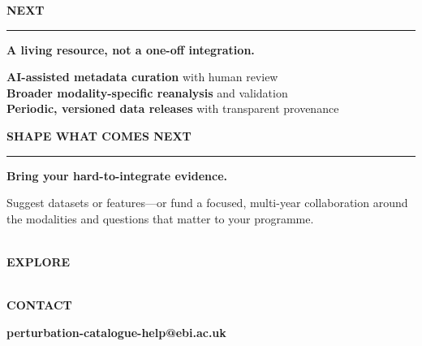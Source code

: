 \documentclass[20pt]{extarticle}
\newcommand{\sectionhead}[2]{%
  {\fontsize{17}{18}\selectfont\bfseries\color{#1}\MakeUppercase{#2}}\\[-1mm]
  {\color{#1}\rule{38mm}{2.3mm}}\par\vspace{4mm}}
\newcommand{\bighead}[1]{%
  {\fontsize{37}{40}\selectfont\bfseries\color{Navy}#1\par}}
\begin{document}
\begin{minipage}{\textwidth}
\vspace{6mm}
\begin{minipage}[t]{0.56\linewidth}
  \sectionhead{Emerald}{Next}
  \bighead{A living resource, not a one-off integration.}
  \vspace{3mm}
  \begin{tcolorbox}[enhanced,boxrule=0pt,arc=7mm,colback=Mint,
    left=9mm,right=9mm,top=7mm,bottom=7mm]
    {\fontsize{20}{25}\selectfont
      \textbf{AI-assisted metadata curation} with human review\\[3mm]
      \textbf{Broader modality-specific reanalysis} and validation\\[3mm]
      \textbf{Periodic, versioned data releases} with transparent provenance}
  \end{tcolorbox}
\end{minipage}\hfill
\begin{minipage}[t]{0.405\linewidth}
  \sectionhead{Coral}{Shape what comes next}
  \begin{tcolorbox}[enhanced,boxrule=0pt,arc=7mm,colback=Navy,
    left=9mm,right=9mm,top=8mm,bottom=8mm]
    {\fontsize{27}{30}\selectfont\bfseries\color{White}Bring your hard-to-integrate evidence.}\par
    \vspace{3mm}
    {\fontsize{17}{22}\selectfont\color{White}
      Suggest datasets or features---or fund a focused, multi-year collaboration around the modalities and questions that matter to your programme.}
    \vspace{6mm}

    \begin{minipage}[c]{0.46\linewidth}\centering
      {\setlength{\fboxsep}{3mm}\colorbox{White}{\color{Ink}\href{https://www.ebi.ac.uk/perturbation-catalogue/}{}}}\\[2mm]
      {\fontsize{14}{17}\selectfont\bfseries\color{White}EXPLORE}
    \end{minipage}\hfill
    \begin{minipage}[c]{0.46\linewidth}\centering
      {\setlength{\fboxsep}{3mm}\colorbox{White}{\color{Ink}\href{mailto:perturbation-catalogue-help@ebi.ac.uk}{}}}\\[2mm]
      {\fontsize{14}{17}\selectfont\bfseries\color{White}CONTACT}
    \end{minipage}

    \vspace{5mm}
    {\fontsize{16}{19}\selectfont\bfseries\color{White}
      perturbation-catalogue-help@ebi.ac.uk}
  \end{tcolorbox}
\end{minipage}


\end{minipage}
\end{document}

